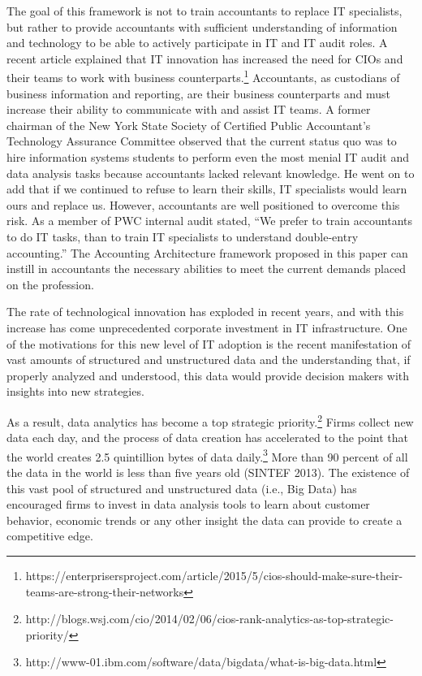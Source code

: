 \documentclass[12pt]{article}
\begin{document}
The goal of this framework is not to train accountants to replace IT specialists, but rather to provide accountants with sufficient understanding of information and technology to be able to actively participate in IT and IT audit roles. A recent article explained that IT innovation has increased the need for CIOs and their teams to work with business counterparts.\footnote{https://enterprisersproject.com/article/2015/5/cios-should-make-sure-their-teams-are-strong-their-networks} Accountants, as custodians of business information and reporting, are their business counterparts and must increase their ability to communicate with and assist IT teams. A former chairman of the New York State Society of Certified Public Accountant's Technology Assurance Committee observed that the current status quo was to hire information systems students to perform even the most menial IT audit and data analysis tasks because accountants lacked relevant knowledge. He went on to add that if we continued to refuse to learn their skills, IT specialists would learn ours and replace us. However, accountants are well positioned to overcome this risk. As a member of PWC internal audit stated, ``We prefer to train accountants to do IT tasks, than to train IT specialists to understand double-entry accounting.'' The Accounting Architecture framework proposed in this paper can instill in accountants the necessary abilities to meet the current demands placed on the profession.

The rate of technological innovation has exploded in recent years, and with this increase has come unprecedented corporate investment in IT infrastructure. One of the motivations for this new level of IT adoption is the recent manifestation of vast amounts of structured and unstructured data and the understanding that, if properly analyzed and understood, this data would provide decision makers with insights into new strategies.

As a result, data analytics has become a top strategic priority.\footnote{http://blogs.wsj.com/cio/2014/02/06/cios-rank-analytics-as-top-strategic-priority/} Firms collect new data each day, and the process of data creation has accelerated to the point that the world creates 2.5 quintillion bytes of data daily.\footnote{http://www-01.ibm.com/software/data/bigdata/what-is-big-data.html} More than 90 percent of all the data in the world is less than five years old (SINTEF 2013). The existence of this vast pool of structured and unstructured data (i.e., Big Data) has encouraged firms to invest in data analysis tools to learn about customer behavior, economic trends or any other insight the data can provide to create a competitive edge.
\end{document}
